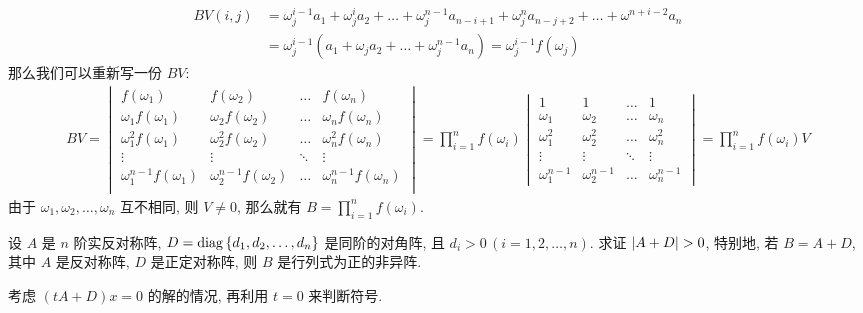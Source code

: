 \begin{exercise}[series=exer]
\begin{answer}
\begin{align*}
            BV(i, j) & = \omega_{j}^{i-1}a_{1} + \omega_{j}^{i}a_{2} + \dots + \omega_{j}^{n-1}a_{n-i+1} + \omega_{j}^{n}a_{n-j+2} + \dots + \omega^{n+i-2}a_{n}\\
            & = \omega_{j}^{i-1}(a_{1} + \omega_{j}a_{2} + \dots + \omega_{j}^{n-1}a_{n}) = \omega_{j}^{i-1}f(\omega_{j})
        \end{align*}
        那么我们可以重新写一份 $ BV $:
        \begin{align*}
            BV = \begin{vmatrix}
                f(\omega_{1}) & f(\omega_{2}) & \dots & f(\omega_{n})\\
                \omega_{1}f(\omega_{1}) & \omega_{2}f(\omega_{2}) & \dots & \omega_{n}f(\omega_{n})\\
                \omega_{1}^{2}f(\omega_{1}) & \omega_{2}^{2}f(\omega_{2}) & \dots & \omega_{n}^{2}f(\omega_{n})\\
                \vdots & \vdots & \ddots & \vdots\\
                \omega_{1}^{n-1}f(\omega_{1}) & \omega_{2}^{n-1}f(\omega_{2}) & \dots & \omega_{n}^{n-1}f(\omega_{n})\\
            \end{vmatrix} = \prod_{i = 1}^{n}f(\omega_{i}) 
            \begin{vmatrix}
                1 & 1 & \dots & 1\\
                \omega_{1} & \omega_{2} & \dots & \omega_{n}\\
                \omega_{1}^{2} & \omega_{2}^{2} & \dots & \omega_{n}^{2}\\
                \vdots & \vdots & \ddots & \vdots\\
                \omega_{1}^{n-1} & \omega_{2}^{n-1} & \dots & \omega_{n}^{n-1}
            \end{vmatrix}= \prod_{i = 1}^{n}f(\omega_{i})V
        \end{align*} 
        由于 $ \omega_{1}, \omega_{2}, \dots, \omega_{n} $ 互不相同, 则 $ V \ne 0 $, 那么就有 $ B = \prod_{i = 1}^{n}f(\omega_{i}) $.
    \end{answer}
    \sitem\label{item:反称加对角} 设 $ A $ 是 $ n $ 阶实反对称阵, $ D = \operatorname{diag}\qty{d_{1}, d_{2}, \dots, d_{n}} $ 是同阶的对角阵, 且 $ d_{i} > 0\,(i = 1, 2, \dots, n) $. 求证 $ \abs{A + D} > 0 $, 特别地, 若 $ B = A + D $, 其中 $ A $ 是反对称阵, $ D $ 是正定对称阵, 则 $ B $ 是行列式为正的非异阵. 
    \begin{hint}
        考虑 $ (tA + D)x = 0 $ 的解的情况, 再利用 $ t = 0 $ 来判断符号. 

\end{hint}
\end{exercise}
